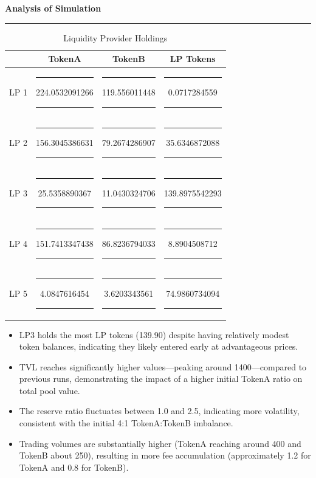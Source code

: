 \documentclass[a4paper]{article}
\newenvironment{solution}[2][]{%
\begin{mdframed}[linecolor=blue!70!black, linewidth=2pt, roundcorner=10pt, backgroundcolor=yellow!10!white, skipabove=12pt, skipbelow=12pt]%
	\textbf{\large #2}
	\par\noindent\rule{\textwidth}{0.4pt}
}{
\end{mdframed}
}
\begin{document}
\begin{solution}{Analysis of Simulation}
\begin{itemize}
\begin{table}[H]
	\centering
	\begin{tabular}{|c|c|c|c|}
	\hline
	\textbf{\rule{0pt}{1.2em}Liquidity Provider} & \textbf{TokenA} & \textbf{TokenB} & \textbf{LP Tokens} \\ \hline
	LP 1 & \rule{0.5em}{0pt}224.0532091266\rule{0.5em}{0pt} & \rule{0.5em}{0pt}119.556011448\rule{0.5em}{0pt} & \rule{0.5em}{0pt}0.0717284559\rule{0.5em}{0pt} \\ \hline
	LP 2 & \rule{0.5em}{0pt}156.3045386631\rule{0.5em}{0pt} & \rule{0.5em}{0pt}79.2674286907\rule{0.5em}{0pt} & \rule{0.5em}{0pt}35.6346872088\rule{0.5em}{0pt} \\ \hline
	LP 3 & \rule{0.5em}{0pt}25.5358890367\rule{0.5em}{0pt} & \rule{0.5em}{0pt}11.0430324706\rule{0.5em}{0pt} & \rule{0.5em}{0pt}139.8975542293\rule{0.5em}{0pt} \\ \hline
	LP 4 & \rule{0.5em}{0pt}151.7413347438\rule{0.5em}{0pt} & \rule{0.5em}{0pt}86.8236794033\rule{0.5em}{0pt} & \rule{0.5em}{0pt}8.8904508712\rule{0.5em}{0pt} \\ \hline
	LP 5 & \rule{0.5em}{0pt}4.0847616454\rule{0.5em}{0pt} & \rule{0.5em}{0pt}3.6203343561\rule{0.5em}{0pt} & \rule{0.5em}{0pt}74.9860734094\rule{0.5em}{0pt} \\ \hline
	\end{tabular}
	\caption{Liquidity Provider Holdings}
\end{table}
\begin{itemize}
	\item LP3 holds the most LP tokens (139.90) despite having relatively modest token balances, indicating they likely entered early at advantageous prices.

	\item TVL reaches significantly higher values—peaking around 1400—compared to previous runs, demonstrating the impact of a higher initial TokenA ratio on total pool value.
	\item The reserve ratio fluctuates between 1.0 and 2.5, indicating more volatility, consistent with the initial 4:1 TokenA:TokenB imbalance.
	\item Trading volumes are substantially higher (TokenA reaching around 400 and TokenB about 250), resulting in more fee accumulation (approximately 1.2 for TokenA and 0.8 for TokenB).
  \end{itemize}
  

\end{itemize}
\end{solution}
\end{document}
